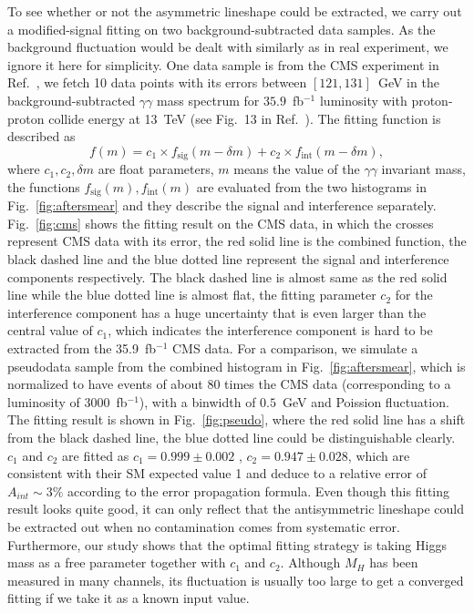 \documentclass[twocolumn,
prd,amssymb,amsmath,preprintnumbers,
floatfix,aps,nofootinbib]{revtex4-1}
\newcommand{\beq}{\begin{equation}}
\newcommand{\eeq}{\end{equation}}
\newcommand{\red}{\color{red}}
\newcommand{\black}{\color{black}}
\begin{document}
To see whether or not the asymmetric lineshape could be extracted,
we carry out a modified-signal fitting on two background-subtracted
 data samples.
As the background fluctuation would be 
dealt with \black similarly
as in real experiment, we ignore it here for simplicity.
One data sample is from the CMS experiment in Ref.~\cite{CMS:2017rli}, we fetch 10 data points with its errors between $[121,131]$~GeV
 in the background-subtracted $\gamma\gamma$ mass spectrum
 for $35.9$~fb$^{-1}$ luminosity with proton-proton
collide energy at 13~TeV (see Fig.~13 in Ref.~\cite{CMS:2017rli}).
The fitting function is described as
\beq
f(m)=c_1\times f_{\text{sig}}(m-\delta m)+c_2\times f_{\text{int}}(m-\delta m),
\eeq
where $c_1, c_2, \delta m$ are float parameters, $m$ means the value of
 the $\gamma\gamma$ invariant mass, the functions $f_{\text{sig}}(m), f_{\text{int}}(m)$
are evaluated from the two histograms in Fig.~\ref{fig:aftersmear}
and they describe the signal and interference separately.
Fig.~\ref{fig:cms} shows the fitting result on the CMS data, in which the crosses represent CMS data with its error,
 the red solid line is the combined function, the black dashed line and the blue dotted line represent the signal and interference components respectively.
The black dashed line is almost same as the red solid line while the blue dotted line is almost flat,
 the fitting parameter $c_2$ for the interference component
 has a huge uncertainty 
that is even \black larger than the central value of $c_1$, which indicates the interference component is
hard to be extracted from
the 35.9~fb$^{-1}$ CMS data.
For a comparison, we simulate a pseudodata sample from the combined histogram in Fig.~\ref{fig:aftersmear},
 which is normalized to have events of about 80 times the CMS data (corresponding to a luminosity of 3000~fb$^{-1}$), with a binwidth of $0.5$~GeV and Poission fluctuation. The fitting result is shown in Fig.~\ref{fig:pseudo},
where the red solid line has a shift from the black dashed line,
the blue dotted line could be distinguishable clearly.
$c_1$ and $c_2$ are fitted as $c_1= 0.999\pm 0.002 $ , $c_2=0.947 \pm 0.028 $, which are consistent with their SM expected value 1 and deduce to a relative error of $A_{int}\sim 3\%$ according to the error propagation formula.
\black
Even though this fitting result looks quite good, it can only reflect
that the antisymmetric lineshape could be extracted out when no
contamination comes from systematic error.
Furthermore, our study shows that the optimal fitting strategy is taking Higgs mass as a free parameter together with $c_1$ and $c_2$. Although $M_H$ has been measured in many channels, its fluctuation is usually too large to get a converged fitting if we take it as a known input value.
\black
\end{document}
